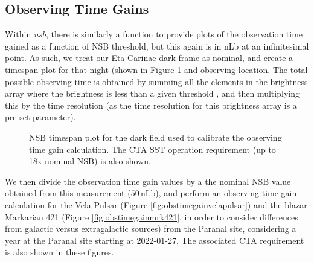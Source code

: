 \subsection{Observing Time Gains}
Within \textit{nsb}, there is similarly a function to provide plots of the observation time gained as a function of NSB threshold, but this again is in nLb at an infinitesimal point. As such, we treat our Eta Carinae dark frame as nominal, and create a timespan plot for that night (shown in Figure \ref{fig:timespan_dark} and observing location. The total possible observing time is obtained by summing all the elements in the brightness array where the brightness is less than a given threshold , and then multiplying this by the time resolution (as the time resolution for this brightness array is a pre-set parameter).
\begin{figure}[t!]
\begin{centering}
\caption{NSB timespan plot for the dark field used to calibrate the observing time gain calculation. The CTA SST operation requirement (up to 18x nominal NSB) is also shown.}
\label{fig:timespan_dark}
\end{centering}
\end{figure}

We then divide the observation time gain values by a the nominal NSB value obtained from this measurement ($\mathrm{50\,nLb}$), and perform an observing time gain calculation for the Vela Pulsar (Figure \ref{fig:obstimegainvelapulsar}) and the blazar Markarian 421 (Figure \ref{fig:obstimegainmrk421}, in order to consider differences from galactic versus extragalactic sources) from the Paranal site, considering a year at the Paranal site starting at 2022-01-27. The associated CTA requirement is also shown in these figures.

